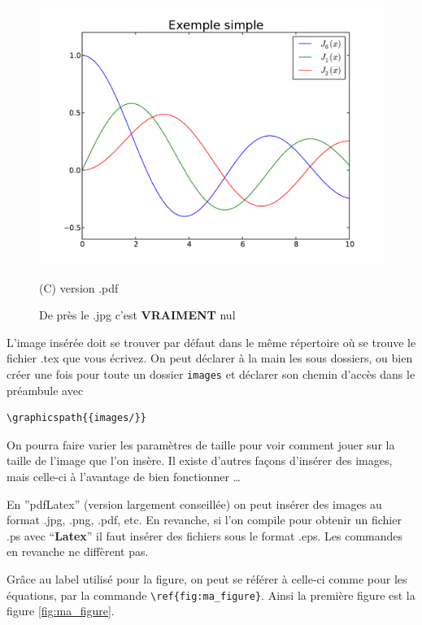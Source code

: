 \begin{figure}[htb]
\hfill
\begin{minipage}[b]{.33\linewidth}
  \centering
 \centerline{\includegraphics[clip,viewport=400 300 520 450,width=1.\textwidth]{example_simple_pdf}}
  \vspace{0.1cm}
  \centerline{(C) version .pdf}\medskip
\end{minipage}%
\caption{De pr\`es le .jpg c'est \textbf{VRAIMENT} nul}
\label{fig:ma_figure_zoom}
\end{figure}


L'image insérée doit se trouver par défaut dans le même répertoire où se trouve le fichier .tex 
que vous écrivez. On peut d\'eclarer \`a la main les sous dossiers, ou bien cr\'eer une fois
pour toute un dossier \lstinline+images+ et d\'eclarer son chemin d'acc\`es dans le préambule
avec
\begin{lstlisting}
\graphicspath{{images/}} 
\end{lstlisting}



On pourra faire varier les paramètres de taille pour voir comment jouer sur la 
taille de l'image que l'on insère. Il existe d'autres façons d'insérer des images, mais celle-ci
 à l'avantage de bien fonctionner \ldots \medskip


En ''pdfLatex'' (version largement conseillée)  on peut insérer des images au format .jpg, .png, 
.pdf, etc. En revanche, si l'on compile pour obtenir un fichier .ps avec ``\textbf{Latex}'' il 
faut insérer des fichiers sous le format .eps. Les commandes en revanche ne diffèrent
 pas.\medskip

Grâce au label utilisé pour la figure, on peut se référer à celle-ci comme pour les équations,
 par la commande \lstinline+\ref{fig:ma_figure}+. Ainsi la première figure est la figure \ref{fig:ma_figure}.

